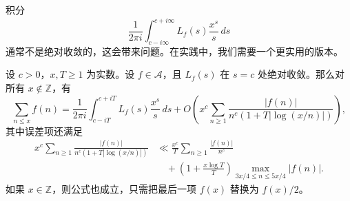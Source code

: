 \begin{remark}
	积分
	\[
		\frac1{2\pi i}\int_{c-i\infty}^{c+i\infty}
		L_f(s)\frac{x^s}{s}\,ds
	\]
	通常不是绝对收敛的，这会带来问题。在实践中，我们需要一个更实用的版本。
\end{remark}

\begin{theorem}
	设 $c>0$，$x,T\geq 1$ 为实数。设 $f\in\mathcal A$，且 $L_f(s)$ 在 $s=c$ 处绝对收敛。那么对所有 $x\notin\mathbb Z$，有
	\[
		\sum_{n\leq x}f(n)
		=
		\frac1{2\pi i}\int_{c-iT}^{c+iT}
		L_f(s)\frac{x^s}{s}\,ds
		+
		O\left(
		x^c\sum_{n\geq 1}
		\frac{|f(n)|}{n^c(1+T|\log(x/n)|)}
		\right),
	\]
	其中误差项还满足
	\[
	\begin{aligned}
		x^c\sum_{n\geq 1}
		\frac{|f(n)|}{n^c(1+T|\log(x/n)|)}
		&\ll
		\frac{x^c}{T}\sum_{n\geq 1}\frac{|f(n)|}{n^c}\\
		&\quad+
		\left(1+\frac{x\log T}{T}\right)
		\max_{3x/4\leq n\leq 5x/4}|f(n)|.
	\end{aligned}
	\]
	如果 $x\in\mathbb Z$，则公式也成立，只需把最后一项 $f(x)$ 替换为 $f(x)/2$。
\end{theorem}

